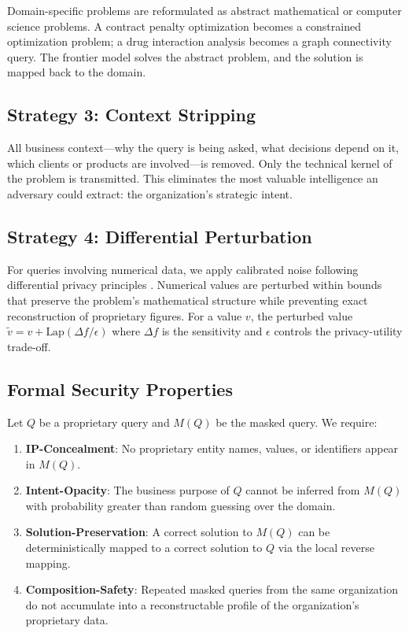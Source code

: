 \documentclass[11pt,a4paper]{article}
\begin{document}
Domain-specific problems are reformulated as abstract mathematical or computer science problems. A contract penalty optimization becomes a constrained optimization problem; a drug interaction analysis becomes a graph connectivity query. The frontier model solves the abstract problem, and the solution is mapped back to the domain.

\subsection{Strategy 3: Context Stripping}

All business context---why the query is being asked, what decisions depend on it, which clients or products are involved---is removed. Only the technical kernel of the problem is transmitted. This eliminates the most valuable intelligence an adversary could extract: the organization's strategic intent.

\subsection{Strategy 4: Differential Perturbation}

For queries involving numerical data, we apply calibrated noise following differential privacy principles \citep{dwork2006differential}. Numerical values are perturbed within bounds that preserve the problem's mathematical structure while preventing exact reconstruction of proprietary figures. For a value $v$, the perturbed value $\tilde{v} = v + \text{Lap}(\Delta f / \epsilon)$ where $\Delta f$ is the sensitivity and $\epsilon$ controls the privacy-utility trade-off.

\subsection{Formal Security Properties}

Let $Q$ be a proprietary query and $M(Q)$ be the masked query. We require:

\begin{enumerate}[leftmargin=2em]
    \item \textbf{IP-Concealment}: No proprietary entity names, values, or identifiers appear in $M(Q)$.
    \item \textbf{Intent-Opacity}: The business purpose of $Q$ cannot be inferred from $M(Q)$ with probability greater than random guessing over the domain.
    \item \textbf{Solution-Preservation}: A correct solution to $M(Q)$ can be deterministically mapped to a correct solution to $Q$ via the local reverse mapping.
    \item \textbf{Composition-Safety}: Repeated masked queries from the same organization do not accumulate into a reconstructable profile of the organization's proprietary data.
\end{enumerate}
\end{document}
